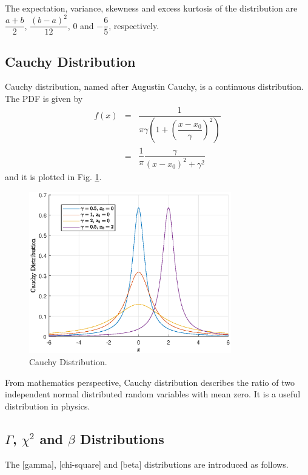 The expectation, variance, skewness and excess kurtosis of the distribution are $\dfrac{a+b}{2}$, $\dfrac{(b-a)^2}{12}$, $0$ and $-\dfrac{6}{5}$, respectively.

\subsection{Cauchy Distribution}

Cauchy distribution, named after Augustin Cauchy, is a continuous distribution. The PDF is given by
\begin{eqnarray}
  f(x) &=& \dfrac{1}{\pi\gamma\left(1+\left(\dfrac{x-x_0}{\gamma}\right)^2\right)} \nonumber \\ &=& \dfrac{1}{\pi}\dfrac{\gamma}{(x-x_0)^2+\gamma^2} \nonumber
\end{eqnarray}
and it is plotted in Fig. \ref{fig:cauchy_pdf}.

\begin{figure}[!htb]
	\centering
	\includegraphics[width=250pt]{chapters/part-1/figures/cauchy_pdf.eps}
	\caption{Cauchy Distribution.} \label{fig:cauchy_pdf}
\end{figure}

From mathematics perspective, Cauchy distribution describes the ratio of two independent normal distributed random variables with mean zero. It is a useful distribution in physics.

\subsection{$\Gamma$, $\chi^2$ and $\beta$ Distributions}

The \mync{$\Gamma$}[gamma], [chi-square] and \mync{$\beta$}[beta] distributions are introduced as follows.


